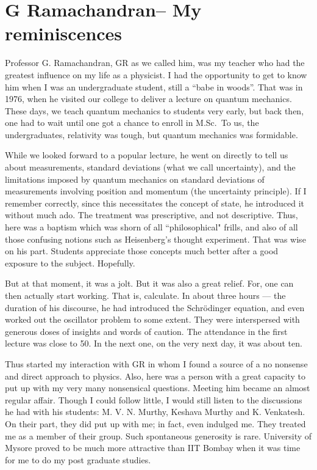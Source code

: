 \chapter[G Ramachandran -- My reminiscences]{G Ramachandran\break -- My reminiscences}\label{chap25}




Professor G. Ramachandran, GR as we called him, was my teacher who had the greatest influence on my life as a physicist. I had the opportunity to get to know him when I was an undergraduate student, still a “babe in woods”. That was in 1976, when he visited our college to deliver a lecture on quantum mechanics. These days, we teach quantum mechanics to students very early, but back then, one had to wait until one got a chance to enroll in M.Sc.\ To us, the undergraduates, relativity was tough, but quantum mechanics was formidable.

While we looked forward to a popular lecture, he went on directly to tell us about measurements, standard deviations (what we call uncertainty), and the limitations imposed by quantum mechanics on standard deviations of measurements involving position and momentum (the uncertainty principle). If I remember correctly, since this necessitates the concept of state, he introduced it without much ado. The treatment was prescriptive, and not descriptive.  Thus, here was a baptism which was shorn of all ``philosophical" frills, and also of all those confusing notions such as Heisenberg's thought experiment. That was wise on his part. Students appreciate those concepts much better after a good exposure to the subject. Hopefully.

But at that moment, it was a jolt.  But it was also a great relief. For, one can then actually start working. That is, calculate. In about three hours --- the duration of his discourse, he had introduced the Schr\"{o}dinger equation, and even worked out the oscillator problem to some extent. They were interspersed with generous doses of insights and words of caution. The attendance in the first lecture was close to 50. In the next one, on the very next day, it was about ten.

Thus started my interaction with GR in whom I found a source of a no nonsense and direct approach to physics. Also, here was a person with a great capacity to put up with my very many nonsensical questions. Meeting him became an almost regular affair. Though I could follow little, I would still listen to the discussions he had with his students: M. V. N. Murthy, Keshava Murthy and K. Venkatesh. On their part, they did put up with me; in fact, even indulged me. They treated me as a member of their group. Such spontaneous generosity is rare. University of Mysore proved to be much more attractive than IIT Bombay when it was time for me to do my post graduate studies.

